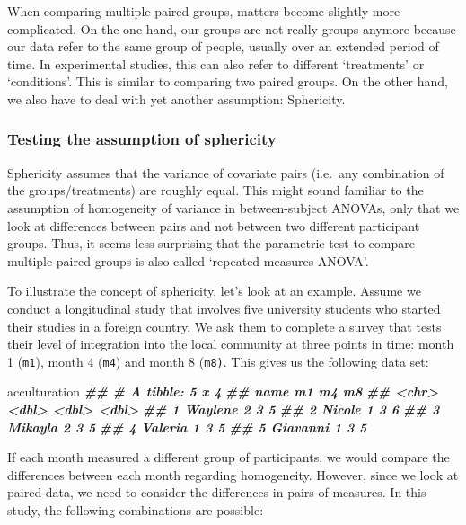 \documentclass[
]{book}
\newenvironment{Shaded}{\begin{snugshade}}{\end{snugshade}}
\newcommand{\DocumentationTok}[1]{\textcolor[rgb]{0.56,0.35,0.01}{\textbf{\textit{#1}}}}
\newcommand{\NormalTok}[1]{#1}
\begin{document}
When comparing multiple paired groups, matters become slightly more complicated. On the one hand, our groups are not really groups anymore because our data refer to the same group of people, usually over an extended period of time. In experimental studies, this can also refer to different `treatments' or `conditions'. This is similar to comparing two paired groups. On the other hand, we also have to deal with yet another assumption: Sphericity.

\hypertarget{sphericity}{%
\subsubsection{Testing the assumption of sphericity}\label{sphericity}}

Sphericity assumes that the variance of covariate pairs (i.e.~any combination of the groups/treatments) are roughly equal. This might sound familiar to the assumption of homogeneity of variance in between-subject ANOVAs, only that we look at differences between pairs and not between two different participant groups. Thus, it seems less surprising that the parametric test to compare multiple paired groups is also called `repeated measures ANOVA'.

To illustrate the concept of sphericity, let's look at an example. Assume we conduct a longitudinal study that involves five university students who started their studies in a foreign country. We ask them to complete a survey that tests their level of integration into the local community at three points in time: month 1 (\texttt{m1}), month 4 (\texttt{m4}) and month 8 (\texttt{m8)}. This gives us the following data set:

\begin{Shaded}
\begin{Highlighting}[]
\NormalTok{acculturation}
\DocumentationTok{\#\# \# A tibble: 5 x 4}
\DocumentationTok{\#\#   name        m1    m4    m8}
\DocumentationTok{\#\#   \textless{}chr\textgreater{}    \textless{}dbl\textgreater{} \textless{}dbl\textgreater{} \textless{}dbl\textgreater{}}
\DocumentationTok{\#\# 1 Waylene      2     3     5}
\DocumentationTok{\#\# 2 Nicole       1     3     6}
\DocumentationTok{\#\# 3 Mikayla      2     3     5}
\DocumentationTok{\#\# 4 Valeria      1     3     5}
\DocumentationTok{\#\# 5 Giavanni     1     3     5}
\end{Highlighting}
\end{Shaded}

If each month measured a different group of participants, we would compare the differences between each month regarding homogeneity. However, since we look at paired data, we need to consider the differences in pairs of measures. In this study, the following combinations are possible:
\end{document}
